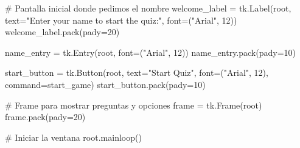 # Pantalla inicial donde pedimos el nombre
welcome_label = tk.Label(root, text="Enter your name to start the quiz:", font=("Arial", 12))
welcome_label.pack(pady=20)

name_entry = tk.Entry(root, font=("Arial", 12))
name_entry.pack(pady=10)

start_button = tk.Button(root, text="Start Quiz", font=("Arial", 12), command=start_game)
start_button.pack(pady=10)

# Frame para mostrar preguntas y opciones
frame = tk.Frame(root)
frame.pack(pady=20)

# Iniciar la ventana
root.mainloop()
